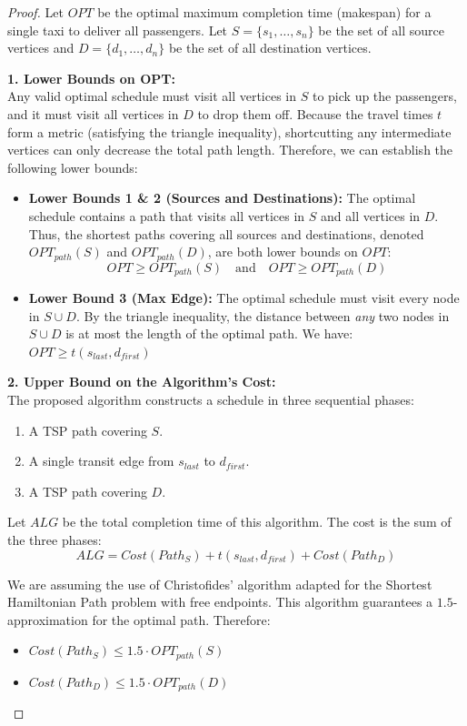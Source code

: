 \begin{proof}
Let $OPT$ be the optimal maximum completion time (makespan) for a single taxi to deliver all passengers. Let $S = \{s_1, \dots, s_n\}$ be the set of all source vertices and $D = \{d_1, \dots, d_n\}$ be the set of all destination vertices.

\noindent\textbf{1. Lower Bounds on OPT:}\\
Any valid optimal schedule must visit all vertices in $S$ to pick up the passengers, and it must visit all vertices in $D$ to drop them off. Because the travel times $t$ form a metric (satisfying the triangle inequality), shortcutting any intermediate vertices can only decrease the total path length. Therefore, we can establish the following lower bounds:
\begin{itemize}
\item \textbf{Lower Bounds 1 \& 2 (Sources and Destinations):} The optimal schedule contains a path that visits all vertices in $S$ and all vertices in $D$. Thus, the shortest paths covering all sources and destinations, denoted $OPT_{path}(S)$ and $OPT_{path}(D)$, are both lower bounds on $OPT$:
$$OPT \geq OPT_{path}(S) \quad \text{and} \quad OPT \geq OPT_{path}(D)$$
    \item \textbf{Lower Bound 3 (Max Edge):} The optimal schedule must visit every node in $S \cup D$. By the triangle inequality, the distance between \emph{any} two nodes in $S \cup D$ is at most the length of the optimal path. We have: $OPT \geq t(s_{last}, d_{first})$
\end{itemize}

\noindent\textbf{2. Upper Bound on the Algorithm's Cost:}\\
The proposed algorithm constructs a schedule in three sequential phases:
\begin{enumerate}
    \item A TSP path covering $S$.
    \item A single transit edge from $s_{last}$ to $d_{first}$.
    \item A TSP path covering $D$.
\end{enumerate}

Let $ALG$ be the total completion time of this algorithm. The cost is the sum of the three phases:
$$ALG = Cost(Path_S) + t(s_{last}, d_{first}) + Cost(Path_D)$$

We are assuming the use of Christofides' algorithm adapted for the Shortest Hamiltonian Path problem with free endpoints. This algorithm guarantees a $1.5$-approximation for the optimal path. Therefore:
\begin{itemize}
    \item $Cost(Path_S) \leq 1.5 \cdot OPT_{path}(S)$
    \item $Cost(Path_D) \leq 1.5 \cdot OPT_{path}(D)$
\end{itemize}


\end{proof}
